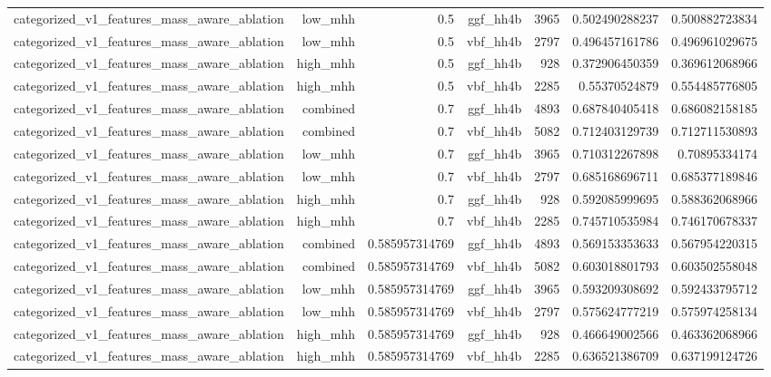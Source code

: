 \begin{table}[htbp]
{\begin{tabular}{lrrrrrr}
categorized\_v1\_features\_mass\_aware\_ablation & low\_mhh & 0.5 & ggf\_hh4b & 3965 & 0.502490288237 & 0.500882723834 \\
categorized\_v1\_features\_mass\_aware\_ablation & low\_mhh & 0.5 & vbf\_hh4b & 2797 & 0.496457161786 & 0.496961029675 \\
categorized\_v1\_features\_mass\_aware\_ablation & high\_mhh & 0.5 & ggf\_hh4b & 928 & 0.372906450359 & 0.369612068966 \\
categorized\_v1\_features\_mass\_aware\_ablation & high\_mhh & 0.5 & vbf\_hh4b & 2285 & 0.55370524879 & 0.554485776805 \\
categorized\_v1\_features\_mass\_aware\_ablation & combined & 0.7 & ggf\_hh4b & 4893 & 0.687840405418 & 0.686082158185 \\
categorized\_v1\_features\_mass\_aware\_ablation & combined & 0.7 & vbf\_hh4b & 5082 & 0.712403129739 & 0.712711530893 \\
categorized\_v1\_features\_mass\_aware\_ablation & low\_mhh & 0.7 & ggf\_hh4b & 3965 & 0.710312267898 & 0.70895334174 \\
categorized\_v1\_features\_mass\_aware\_ablation & low\_mhh & 0.7 & vbf\_hh4b & 2797 & 0.685168696711 & 0.685377189846 \\
categorized\_v1\_features\_mass\_aware\_ablation & high\_mhh & 0.7 & ggf\_hh4b & 928 & 0.592085999695 & 0.588362068966 \\
categorized\_v1\_features\_mass\_aware\_ablation & high\_mhh & 0.7 & vbf\_hh4b & 2285 & 0.745710535984 & 0.746170678337 \\
categorized\_v1\_features\_mass\_aware\_ablation & combined & 0.585957314769 & ggf\_hh4b & 4893 & 0.569153353633 & 0.567954220315 \\
categorized\_v1\_features\_mass\_aware\_ablation & combined & 0.585957314769 & vbf\_hh4b & 5082 & 0.603018801793 & 0.603502558048 \\
categorized\_v1\_features\_mass\_aware\_ablation & low\_mhh & 0.585957314769 & ggf\_hh4b & 3965 & 0.593209308692 & 0.592433795712 \\
categorized\_v1\_features\_mass\_aware\_ablation & low\_mhh & 0.585957314769 & vbf\_hh4b & 2797 & 0.575624777219 & 0.575974258134 \\
categorized\_v1\_features\_mass\_aware\_ablation & high\_mhh & 0.585957314769 & ggf\_hh4b & 928 & 0.466649002566 & 0.463362068966 \\
categorized\_v1\_features\_mass\_aware\_ablation & high\_mhh & 0.585957314769 & vbf\_hh4b & 2285 & 0.636521386709 & 0.637199124726 \\

\end{tabular}}
\end{table}
